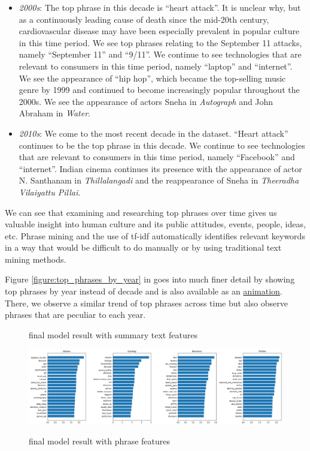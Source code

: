 \documentclass{article}
\begin{document}
\begin{multicols}{2}
\begin{itemize}
    \item \textit{2000s}: The top phrase in this decade is ``heart attack''. It is unclear why, but as a continuously leading cause of death since the mid-20th century, cardiovascular disease may have been especially prevalent in popular culture in this time period. We see top phrases relating to the September 11 attacks, namely ``September 11'' and ``9/11''. We continue to see technologies that are relevant to consumers in this time period, namely ``laptop'' and ``internet''. We see the appearance of ``hip hop'', which became the top-selling music genre by 1999 and continued to become increasingly popular throughout the 2000s. We see the appearance of actors Sneha in \textit{Autograph} and John Abraham in \textit{Water}.
    \item \textit{2010s}: We come to the most recent decade in the dataset. ``Heart attack'' continues to be the top phrase in this decade. We continue to see technologies that are relevant to consumers in this time period, namely ``Facebook'' and ``internet''. Indian cinema continues its presence with the appearance of actor N. Santhanam in \textit{Thillalangadi} and the reappearance of Sneha in \textit{Theeradha Vilaiyattu Pillai}.
\end{itemize}

We can see that examining and researching top phrases over time gives us valuable insight into human culture and its public attitudes, events, people, ideas, etc. Phrase mining and the use of tf-idf automatically identifies relevant keywords in a way that would be difficult to do manually or by using traditional text mining methods.

Figure \ref{figure:top_phrases_by_year} in  goes into much finer detail by showing top phrases by year instead of decade and is also available as an \href{https://www.youtube.com/watch?v=8aOob6iJO5Y}{animation}. There, we observe a similar trend of top phrases across time but also observe phrases that are peculiar to each year.

 \begin{figure}
\caption{final model result with summary text features}
\centering
{}
\label{figure:classification with summary text}
\end{figure}

\begin{figure}
\caption{final model result with phrase features}
\centering
\includegraphics[width=5in]{figures/final model - phrases.png}
\label{figure:classification with phrase}
\end{figure}


\end{multicols}
\end{document}

